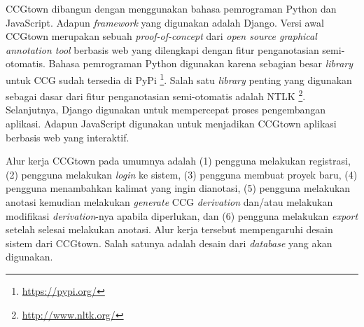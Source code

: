 





CCGtown dibangun dengan menggunakan bahasa pemrograman Python dan JavaScript.
Adapun \textit{framework} yang digunakan adalah Django.
Versi awal CCGtown merupakan sebuah \textit{proof-of-concept} dari
\textit{open source graphical annotation tool} berbasis web yang dilengkapi dengan fitur
penganotasian semi-otomatis.
Bahasa pemrograman Python digunakan karena sebagian besar \textit{library} untuk CCG
sudah tersedia di PyPi \footnote{\url{https://pypi.org/}}.
Salah satu \textit{library} penting yang digunakan sebagai dasar dari fitur penganotasian
semi-otomatis adalah NTLK \footnote{\url{http://www.nltk.org/}}.
Selanjutnya, Django digunakan untuk mempercepat proses pengembangan aplikasi.
Adapun JavaScript digunakan untuk menjadikan CCGtown aplikasi berbasis web yang interaktif.

Alur kerja CCGtown pada umumnya adalah (1) pengguna melakukan registrasi, (2) pengguna
melakukan \textit{login} ke sistem, (3) pengguna membuat proyek baru, (4) pengguna
menambahkan kalimat yang ingin dianotasi, (5) pengguna melakukan anotasi kemudian melakukan
\textit{generate} CCG \textit{derivation} dan/atau melakukan modifikasi
\textit{derivation}-nya apabila diperlukan, dan (6) pengguna melakukan \textit{export}
setelah selesai melakukan anotasi. Alur kerja tersebut mempengaruhi desain sistem dari
CCGtown. Salah satunya adalah desain dari \textit{database} yang akan digunakan.


